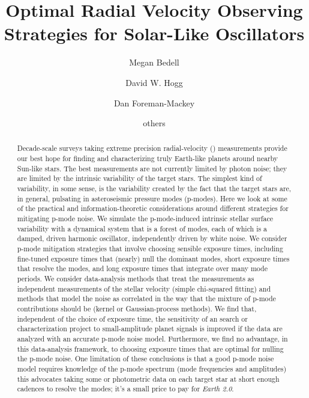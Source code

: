 \documentclass[modern]{aastex62}
\begin{document}
\sloppy\sloppypar\raggedbottom\frenchspacing %

\graphicspath{ {figures/} }

\title{Optimal Radial Velocity Observing Strategies for Solar-Like Oscillators}


\author[0000-0001-9907-7742]{Megan Bedell}
\affiliation{\flatiron}


\author[0000-0003-2866-9403]{David W. Hogg}
\affiliation{\flatiron}
\affiliation{\nyuccpp}
\affiliation{\nyucds}
\affiliation{\mpia}

\author[0000-0002-9328-5652]{Dan Foreman-Mackey}
\affiliation{\flatiron}

\author{others}


\begin{abstract}\noindent
{} 
Decade-scale surveys taking extreme precision radial-velocity (\EPRV)
measurements provide our best hope for finding and characterizing
truly Earth-like planets around nearby Sun-like stars.
The best \EPRV measurements are not currently limited by photon noise;
they are limited by the intrinsic variability of the target stars.
The simplest kind of variability, in some sense, is the variability
created by the fact that the target stars are, in general, pulsating
in asteroseismic pressure modes (p-modes).
Here we look at some of the practical and information-theoretic
considerations around different strategies for mitigating p-mode
noise.
We simulate the p-mode-induced intrinsic stellar surface variability
with a dynamical system that is a forest of modes, each of which is a
damped, driven harmonic oscillator, independently driven by white noise.
We consider p-mode mitigation strategies that involve choosing
sensible exposure times, including fine-tuned exposure times that
(nearly) null the dominant modes, short exposure times that resolve
the modes, and long exposure times that integrate over many mode
periods.
We consider data-analysis methods that treat the measurements as
independent measurements of the stellar velocity (simple chi-squared
fitting) and methods that model the noise as correlated in the way
that the mixture of p-mode contributions should be (kernel or
Gaussian-process methods).
We find that, independent of the choice of exposure time, the
sensitivity of an \EPRV search or characterization project to
small-amplitude planet signals is improved if the data are analyzed
with an accurate p-mode noise model.
Furthermore, we find no advantage, in this data-analysis framework, to
choosing exposure times that are optimal for nulling the p-mode noise.
One limitation of these conclusions is that a good p-mode noise model
requires knowledge of the p-mode spectrum (mode frequencies and
amplitudes) this advocates taking some \EPRV or photometric data on
each target star at short enough cadences to resolve the modes; it's
a small price to pay for \emph{Earth 2.0}.
\end{abstract}
\end{document}
